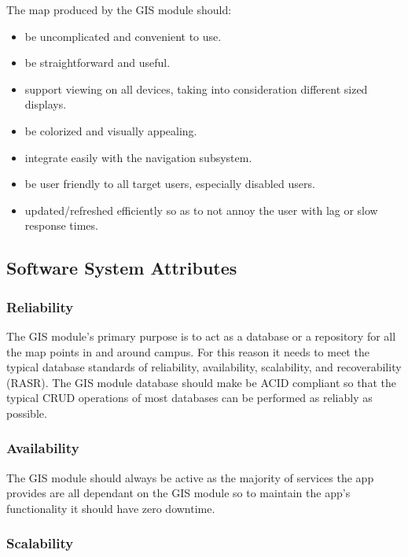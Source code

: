 The map produced by the GIS module should:
\begin{itemize}
\item be uncomplicated and convenient to use.

\item be straightforward and useful.

\item support viewing on all devices, taking into consideration different sized displays.

\item be colorized and visually appealing.

\item integrate easily with the navigation subsystem.

\item be user friendly to all target users, especially disabled users.

\item updated/refreshed efficiently so as to not annoy the user with lag or slow response times.
\end{itemize}
	
	\subsection{Software System Attributes} %

\subsubsection{Reliability}

The GIS module's primary purpose is to act as a database or a repository for all the map points in and around campus. For this reason it needs to meet the typical database standards of reliability, availability, scalability, and recoverability (RASR). The GIS module database should make be ACID compliant so that the typical CRUD operations of most databases can be performed as reliably as possible.

\subsubsection{Availability}

The GIS module should always be active as the majority of services the app provides are all dependant on the GIS module so to maintain the app's functionality it should have zero downtime. 



\subsubsection{Scalability}

